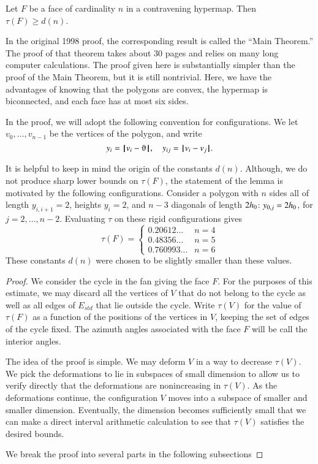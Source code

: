 \begin{lemma} %
Let $F$ be a face of cardinality $n$ in a contravening hypermap.  Then
        $\tau(F) \ge d(n)$.
\end{lemma}

In the original 1998 proof, the corresponding result
is called the ``Main Theorem.''  The proof of that 
theorem takes about 30 pages and relies on many
long computer calculations.  The proof given here
is substantially simpler than the proof of the
Main Theorem, but
it is still nontrivial.  Here, we have the advantages
of knowing that the polygons are convex, the hypermap
is biconnected, and each face has at most six sides.

In the proof, we will adopt the following convention for
configurations.  We let $v_0,\ldots,v_{n-1}$ be the vertices
of the polygon, and write
$$
y_i = \norm{v_i}{\orgn},\quad y_{ij} = \norm{v_i}{ v_j}.
$$

It is helpful to keep in mind the origin of the constants $d(n)$.
Although, we do not produce sharp lower bounds on $\tau(F)$, the
statement of the lemma is motivated by the following configurations.
Consider a polygon with $n$ sides all of length $y_{i,i+1}=2$, heights
$y_i=2$, and $n-3$ diagonals of length $2{h_0}$: $y_{0,j}=2{h_0}$, for
$j=2,\ldots,n-2$.  Evaluating $\tau$ on these rigid configurations gives
$$
\tau(F) = \begin{cases}
0.20612\ldots & n=4\\
0.48356\ldots & n=5\\
0.760993\ldots &n=6
\end{cases}
$$
These constants $d(n)$ were chosen to be slightly smaller than these values.


\begin{proof}  We consider the cycle in the fan
giving the face $F$.  For the purposes of this
estimate, we may discard all the vertices of $V$
that do not belong to the cycle as well as all edges
of $E_{std}$ that lie outside the cycle.
Write $\tau(V)$ for the value of $\tau(F)$ as a
function of the positions of the vertices in $V$,
keeping the set of edges of the cycle fixed.  The
azimuth angles associated with the face $F$ will be
call the interior angles.  

The idea of the proof is simple.  We may deform $V$ in a way to decrease $\tau(V)$.  We pick the deformations to lie in subspaces of small dimension to allow us to verify directly that the deformations are nonincreasing in $\tau(V)$.  As the deformations continue, the configuration $V$ moves into a subspace of smaller and smaller dimension.  Eventually, the dimension becomes sufficiently small that we can make a direct interval arithmetic calculation to see that $\tau(V)$ satisfies the desired bounds.

We break the proof into several parts in the following
subsections
\end{proof}


